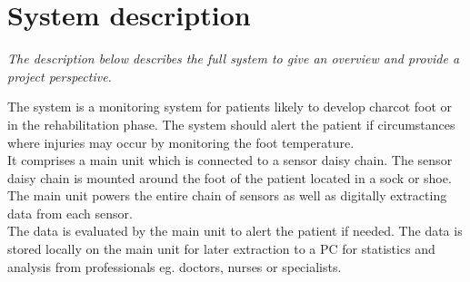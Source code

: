 \chapter{System description}
\textit{The description below describes the full system to give an overview and provide a project perspective.}

The system is a monitoring system for patients likely to develop charcot foot or in the rehabilitation phase. The system should alert the patient if circumstances where injuries may occur by monitoring the foot temperature.\\
It comprises a main unit which is connected to a sensor daisy chain. The sensor daisy chain is mounted around the foot of the patient located in a sock or shoe. The main unit powers the entire chain of sensors as well as digitally extracting data from each sensor.\\
The data is evaluated by the main unit to alert the patient if needed. The data is stored locally on the main unit for later extraction to a PC for statistics and analysis from professionals eg. doctors, nurses or specialists.\\

